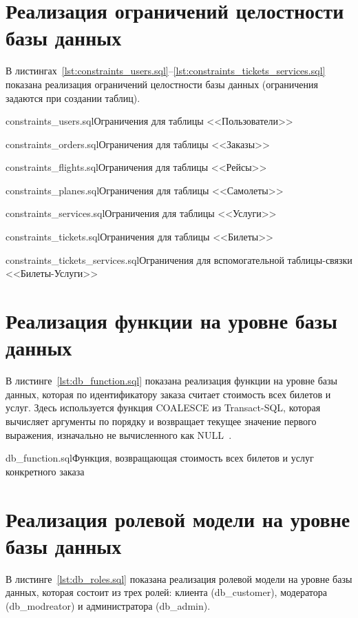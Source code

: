 \documentclass{bmstu}
\begin{document}
\section{Реализация ограничений целостности базы данных}

В листингах~\ref{lst:constraints_users.sql}--\ref{lst:constraints_tickets_services.sql} показана реализация ограничений целостности базы данных (ограничения задаются при создании таблиц).

{constraints_users.sql}{Ограничения для таблицы <<Пользователи>>}

{constraints_orders.sql}{Ограничения для таблицы <<Заказы>>}

{constraints_flights.sql}{Ограничения для таблицы <<Рейсы>>}

{constraints_planes.sql}{Ограничения для таблицы <<Самолеты>>}

{constraints_services.sql}{Ограничения для таблицы <<Услуги>>}

\pagebreak
{}
{constraints_tickets.sql}{Ограничения для таблицы <<Билеты>>}

{constraints_tickets_services.sql}{Ограничения для вспомогательной таблицы-связки <<Билеты-Услуги>>}

\pagebreak
\section{Реализация функции на уровне базы данных}

В листинге~\ref{lst:db_function.sql} показана реализация функции на уровне базы данных, которая по идентификатору заказа считает стоимость всех билетов и услуг. 
Здесь используется функция COALESCE из Transact-SQL, которая вычисляет аргументы по порядку и возвращает текущее значение первого выражения, изначально не вычисленного как \mbox{NULL~\cite{Coalesce}}.

{db_function.sql}{Функция, возвращающая стоимость всех билетов и услуг конкретного заказа}

\pagebreak
\section{Реализация ролевой модели на уровне базы данных}

В листинге~\ref{lst:db_roles.sql} показана реализация ролевой модели на уровне базы данных, которая состоит из трех ролей: клиента (db\_customer), модератора (db\_modreator) и администратора (db\_admin).
\end{document}
